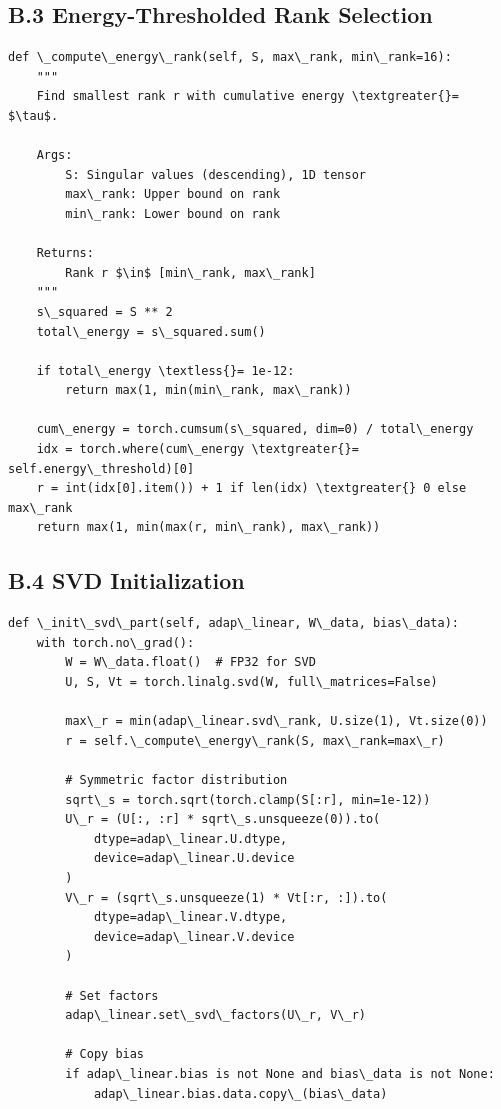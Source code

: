 \subsection{B.3 Energy-Thresholded Rank Selection}

\begin{lstlisting}
def \_compute\_energy\_rank(self, S, max\_rank, min\_rank=16):
    """
    Find smallest rank r with cumulative energy \textgreater{}= $\tau$.
    
    Args:
        S: Singular values (descending), 1D tensor
        max\_rank: Upper bound on rank
        min\_rank: Lower bound on rank
    
    Returns:
        Rank r $\in$ [min\_rank, max\_rank]
    """
    s\_squared = S ** 2
    total\_energy = s\_squared.sum()
    
    if total\_energy \textless{}= 1e-12:
        return max(1, min(min\_rank, max\_rank))
    
    cum\_energy = torch.cumsum(s\_squared, dim=0) / total\_energy
    idx = torch.where(cum\_energy \textgreater{}= self.energy\_threshold)[0]
    r = int(idx[0].item()) + 1 if len(idx) \textgreater{} 0 else max\_rank
    return max(1, min(max(r, min\_rank), max\_rank))
\end{lstlisting}

\subsection{B.4 SVD Initialization}

\begin{lstlisting}
def \_init\_svd\_part(self, adap\_linear, W\_data, bias\_data):
    with torch.no\_grad():
        W = W\_data.float()  # FP32 for SVD
        U, S, Vt = torch.linalg.svd(W, full\_matrices=False)
        
        max\_r = min(adap\_linear.svd\_rank, U.size(1), Vt.size(0))
        r = self.\_compute\_energy\_rank(S, max\_rank=max\_r)
        
        # Symmetric factor distribution
        sqrt\_s = torch.sqrt(torch.clamp(S[:r], min=1e-12))
        U\_r = (U[:, :r] * sqrt\_s.unsqueeze(0)).to(
            dtype=adap\_linear.U.dtype,
            device=adap\_linear.U.device
        )
        V\_r = (sqrt\_s.unsqueeze(1) * Vt[:r, :]).to(
            dtype=adap\_linear.V.dtype,
            device=adap\_linear.V.device
        )
        
        # Set factors
        adap\_linear.set\_svd\_factors(U\_r, V\_r)
        
        # Copy bias
        if adap\_linear.bias is not None and bias\_data is not None:
            adap\_linear.bias.data.copy\_(bias\_data)
\end{lstlisting}

